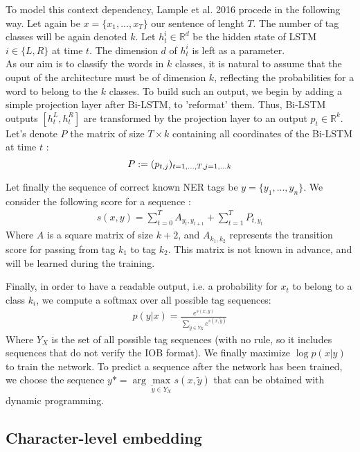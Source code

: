 \documentclass{article}
\newcommand{\R}{\mathbb R}
\begin{document}
To model this context dependency, Lample et al. 2016
 \cite{Lample2016NeuralRecognition} procede in the following way. Let again be 
 $x = \{x_1,..., x_T  \}$ our sentence of lenght $T$. The number of tag classes will be again denoted $k$. 
 Let $h_t^i \in \R^d$ be the hidden state of LSTM $i \in\{L,R\}$ at time $t$. The dimension $d$ of $h_t^i$
 is left as a parameter. \\ 
As our aim is to classify the words in $k$ classes, it is 
 natural to assume that the ouput of the architecture must be of dimension $k$, reflecting
 the probabilities for a word to belong to the $k$ classes. To build such an output, 
 we begin by adding a simple projection layer after Bi-LSTM, to 'reformat' them. 
 Thus, Bi-LSTM outputs $[h_t^L, h_t^R]$
 are transformed by the projection layer to an output $p_t \in \R^k$. 
 Let's denote $P$ the matrix of size $T\times k$ containing all coordinates of 
 the Bi-LSTM at time $t$ : 
\[P:= (p_{t, j})_{t=1, ..., T ,\\ j=1, ...k} \] 

 Let finally the sequence of correct known NER tags be $y = \{y_1, ..., y_n\}$. We 
 consider the following score for a sequence : 
 \begin{align*}
     s(x, y) = \sum_{t=0}^T A_{y_t, y_{t+1} }+ \sum_{t=1}^{T} P_{t, y_t}
 \end{align*}
Where $A$ is a square matrix of size $k+2$, and $A_{k_1, k_2}$ represents the transition
score for passing from tag $k_1$ to tag $k_2$. This matrix is not known in advance, and will 
be learned during the training. \\ \par 
Finally, in order to have a readable output, i.e. a probability for $x_t$ to belong 
to a class $k_i$, we compute a softmax over all possible tag sequences:
\begin{align*}
    p(y|x) = \frac{e^{s(x, y)}}{\sum_{\tilde{y} \in Y_X   } e^{s(x, \tilde{y} )} }
\end{align*}
Where $Y_X$ is the set of all possible tag sequences (with no rule, so it includes 
sequences that do not verify the IOB format). We finally maximize $\log p(x|y)$ to train 
the network. To predict a sequence after the network has been trained, we choose the 
sequence $y* = \arg \underset{\tilde{y} \in Y_X }{\max} s(x, \tilde{y})$ that can be obtained
with dynamic programming.


\subsection{Character-level embedding} \label{subsubsec:charemb}
\end{document}
